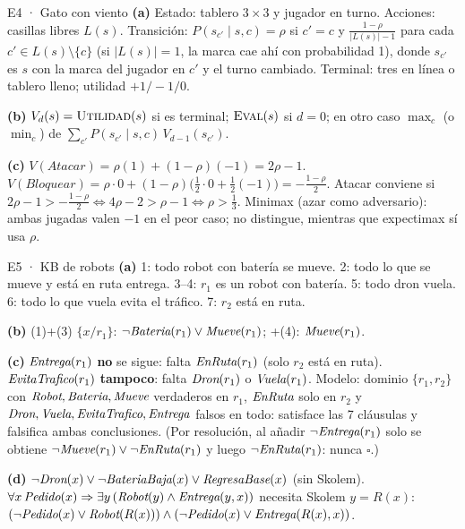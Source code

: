 \begin{solucion}{E4 · Gato con viento}
\textbf{(a)} Estado: tablero $3\times3$ y jugador en turno. Acciones: casillas libres $L(s)$. Transición:
$P(s_{c'}\mid s,c)=\rho$ si $c'=c$ y $\frac{1-\rho}{|L(s)|-1}$ para cada $c'\in L(s)\setminus\{c\}$ (si $|L(s)|=1$, la marca
cae ahí con probabilidad 1), donde $s_{c'}$ es $s$ con la marca del jugador en $c'$ y el turno cambiado.
Terminal: tres en línea o tablero lleno; utilidad $+1/-1/0$.

\textbf{(b)} $V_d(s)=\textsc{Utilidad}(s)$ si es terminal; $\textsc{Eval}(s)$ si $d=0$; en otro caso
$\max_c$ (o $\min_c$) de $\sum_{c'}P(s_{c'}\mid s,c)\,V_{d-1}(s_{c'})$.

\textbf{(c)} $V(\textit{Atacar})=\rho(1)+(1-\rho)(-1)=2\rho-1$. $V(\textit{Bloquear})=\rho\cdot0+(1-\rho)\big(\tfrac12\cdot0+\tfrac12(-1)\big)=-\tfrac{1-\rho}{2}$.
Atacar conviene si $2\rho-1>-\tfrac{1-\rho}{2}\iff 4\rho-2>\rho-1\iff\rho>\tfrac13$. Minimax (azar como adversario):
ambas jugadas valen $-1$ en el peor caso; no distingue, mientras que expectimax sí usa $\rho$.
\end{solucion}

\begin{solucion}{E5 · KB de robots}
\textbf{(a)} 1: todo robot con batería se mueve. 2: todo lo que se mueve y está en ruta entrega. 3–4: $r_1$ es
un robot con batería. 5: todo dron vuela. 6: todo lo que vuela evita el tráfico. 7: $r_2$ está en ruta.

\textbf{(b)} (1)+(3) $\{x/r_1\}$: $\neg\textit{Bateria}(r_1)\vee\textit{Mueve}(r_1)$; +(4): $\textit{Mueve}(r_1)$.

\textbf{(c)} $\textit{Entrega}(r_1)$ \textbf{no} se sigue: falta $\textit{EnRuta}(r_1)$ (solo $r_2$ está en ruta). $\textit{EvitaTrafico}(r_1)$
\textbf{tampoco}: falta $\textit{Dron}(r_1)$ o $\textit{Vuela}(r_1)$. Modelo: dominio $\{r_1,r_2\}$ con $\textit{Robot},\textit{Bateria},\textit{Mueve}$
verdaderos en $r_1$, $\textit{EnRuta}$ solo en $r_2$ y $\textit{Dron},\textit{Vuela},\textit{EvitaTrafico},\textit{Entrega}$ falsos en todo: satisface
las 7 cláusulas y falsifica ambas conclusiones. (Por resolución, al añadir $\neg\textit{Entrega}(r_1)$ solo se
obtiene $\neg\textit{Mueve}(r_1)\vee\neg\textit{EnRuta}(r_1)$ y luego $\neg\textit{EnRuta}(r_1)$: nunca $\square$.)

\textbf{(d)} $\neg\textit{Dron}(x)\vee\neg\textit{BateriaBaja}(x)\vee\textit{RegresaBase}(x)$ (sin Skolem).
$\forall x\,\textit{Pedido}(x)\Rightarrow\exists y\,(\textit{Robot}(y)\wedge\textit{Entrega}(y,x))$ necesita Skolem $y=R(x)$:
$(\neg\textit{Pedido}(x)\vee\textit{Robot}(R(x)))\wedge(\neg\textit{Pedido}(x)\vee\textit{Entrega}(R(x),x))$.
\end{solucion}
